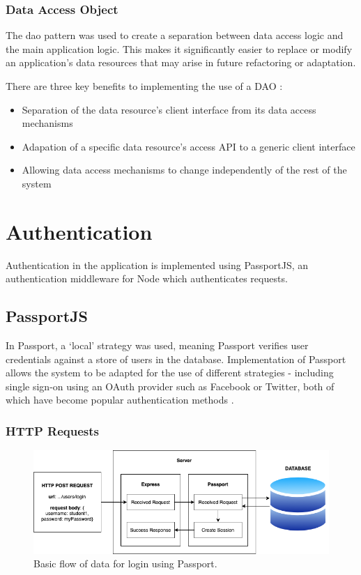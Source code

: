 \subsubsection{Data Access Object}

The \gls{dao} pattern was used to create a separation between data access logic and the main application logic. This makes it significantly easier to replace or modify an application's data resources \cite{daooracle} that may arise in future refactoring or adaptation. 

There are three key benefits to implementing the use of a DAO \cite{daooracle}:

\begin{itemize}
    \item Separation of the data resource's client interface from its data access mechanisms
    \item Adapation of a specific data resource's access API to a generic client interface
    \item Allowing data access mechanisms to change independently of the rest of the system
\end{itemize}

\section{Authentication}

Authentication in the application is implemented using PassportJS, an authentication middleware for Node which authenticates requests. 

\subsection{PassportJS}

In Passport, a `local' strategy was used, meaning Passport verifies user credentials against a store of users in the database. Implementation of Passport allows the system to be adapted for the use of different strategies - including single sign-on using an OAuth provider such as Facebook or Twitter, both of which have become popular authentication methods \cite{passport}. 

\subsubsection{HTTP Requests}

\begin{figure}[H]
    \centering
    \includegraphics[width=\textwidth]{8implementation/images/passport.png}
    \caption{Basic flow of data for login using Passport.}
    \label{fig:passportlogin}
\end{figure}

